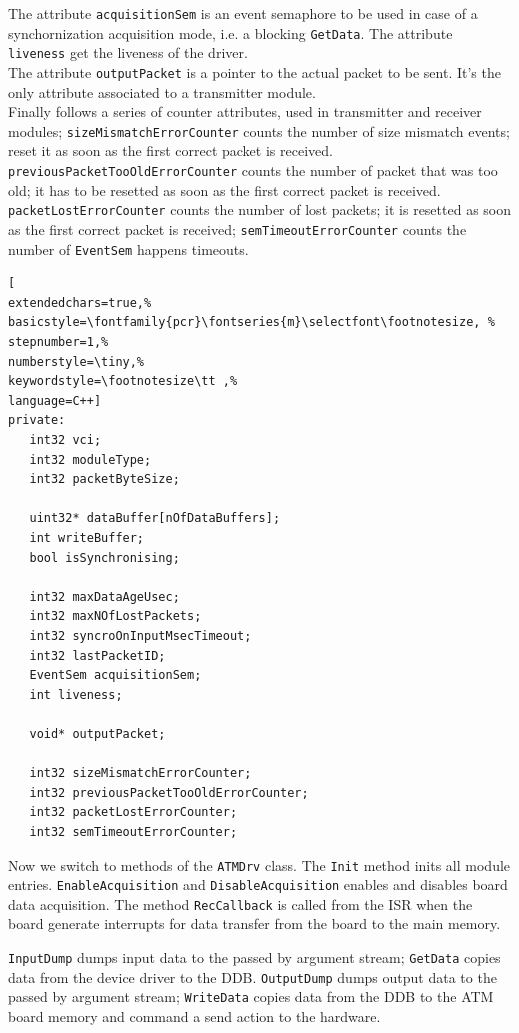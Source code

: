The attribute \texttt{acquisitionSem} is an event semaphore to be used in case of a synchornization acquisition mode, i.e. a blocking \texttt{GetData}. The attribute \texttt{liveness} get the liveness of the driver. \\


The attribute \texttt{outputPacket} is a pointer to the actual packet to be sent. It's the only attribute associated to a transmitter module. \\


Finally follows a series of counter attributes, used in transmitter and receiver modules; \texttt{sizeMismatchErrorCounter} counts the number of size mismatch events; reset it as soon as the first correct packet is received. \texttt{previousPacketTooOldErrorCounter} counts the number of packet that was too old; it has to be resetted as soon as the first correct packet is received. \texttt{packetLostErrorCounter} counts the number of lost packets; it is resetted as soon as the first correct packet is received; \texttt{semTimeoutErrorCounter} counts the number of \texttt{EventSem} happens timeouts.

\begin{lstlisting}[
extendedchars=true,%
basicstyle=\fontfamily{pcr}\fontseries{m}\selectfont\footnotesize, %
stepnumber=1,%
numberstyle=\tiny,%
keywordstyle=\footnotesize\tt ,%
language=C++]
private:
   int32 vci;
   int32 moduleType;
   int32 packetByteSize;

   uint32* dataBuffer[nOfDataBuffers];
   int writeBuffer;
   bool isSynchronising;

   int32 maxDataAgeUsec;
   int32 maxNOfLostPackets;
   int32 syncroOnInputMsecTimeout;
   int32 lastPacketID;
   EventSem acquisitionSem;
   int liveness;

   void* outputPacket;

   int32 sizeMismatchErrorCounter;
   int32 previousPacketTooOldErrorCounter;
   int32 packetLostErrorCounter;
   int32 semTimeoutErrorCounter;
\end{lstlisting}

Now we switch to methods of the \texttt{ATMDrv} class. The \texttt{Init} method inits all module entries. \texttt{EnableAcquisition} and \texttt{DisableAcquisition} enables and disables board data acquisition.
The method \texttt{RecCallback} is called from the ISR when the board generate interrupts for data transfer from the board to the main memory. 

\texttt{InputDump} dumps input data to the passed by argument stream; \texttt{GetData} copies data from the device driver to the DDB. \texttt{OutputDump} dumps output data to the passed by argument stream; \texttt{WriteData} copies data from the DDB to the ATM board memory and command a send action to the hardware.\\


